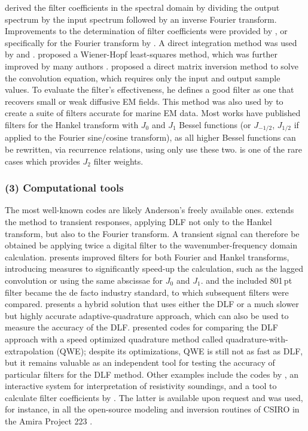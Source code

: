 \documentclass[paper,twocolumn,twoside]{geophysics}
\begin{document}
\cite{PhD.70.Ghosh} derived the filter coefficients in the spectral domain by
dividing the output spectrum by the input spectrum followed by an inverse
Fourier transform. Improvements to the determination of filter coefficients
were provided by \cite{EXG.75.ONeill, GEO.77.Nyman, GEO.82.Das}, or
specifically for the Fourier transform by \cite{GP.86.Nissen}. A direct
integration method was used by \cite{GP.76.Bichara} and \cite{GP.78.Bernabini}.
\cite{GP.79.Koefoed} proposed a Wiener-Hopf least-squares method, which was
further improved by many authors \citep{GP.82.Guptasarma, GEO.1982.Murakami,
GP.97.Guptasarma}. \cite{GP.07.Kong} proposed a direct matrix inversion method
to solve the convolution equation, which requires only the input and output
sample values. To evaluate the filter's effectiveness, he defines a good filter
as one that recovers small or weak diffusive EM fields. This method was also
used by \cite{GEO.09.Key, GEO.12.Key} to create a suite of filters accurate for
marine EM data. Most works have published filters for the Hankel transform with
$J_0$ and $J_1$ Bessel functions (or $J_{-1/2}$, $J_{1/2}$ if applied to the
Fourier sine/cosine transform), as all higher Bessel functions can be
rewritten, via recurrence relations, using only use these two.
\cite{GP.94.Mohsen} is one of the rare cases which provides $J_2$ filter
weights.

\subsubsection{(3) Computational tools}

The most well-known codes are likely Anderson's freely available ones.
\cite{USGS.73.Anderson} extends the method to transient responses, applying DLF
not only to the Hankel transform, but also to the Fourier transform. A
transient signal can therefore be obtained be applying twice a digital filter
to the wavenumber-frequency domain calculation. \cite{USGS.75.Anderson,
GEO.79.Anderson} presents improved filters for both Fourier and Hankel
transforms, introducing measures to significantly speed-up the calculation,
such as the lagged convolution or using the same abscissae for $J_0$ and $J_1$.
\cite{TMS.82.Anderson} and the included 801\,pt filter became the de facto
industry standard, to which subsequent filters were compared.
\cite{GEO.89.Anderson} presents a hybrid solution that uses either the DLF or a
much slower but highly accurate adaptive-quadrature approach, which can also be
used to measure the accuracy of the DLF. \cite{GEO.12.Key} presented codes for
comparing the DLF approach with a speed optimized quadrature method called
quadrature-with-extrapolation (QWE); despite its optimizations, QWE is still
not as fast as DLF, but it remains valuable as an independent tool for testing
the accuracy of particular filters for the DLF method. Other examples include
the codes by \cite{GP.75.Johansen}, an interactive system for interpretation of
resistivity soundings, and a tool to calculate filter coefficients by
\cite{GP.90.Christensen}. The latter is available upon request and was used,
for instance, in all the open-source modeling and inversion routines of CSIRO
in the Amira Project 223 \citep{ASEG.07.Raiche}.
\end{document}
